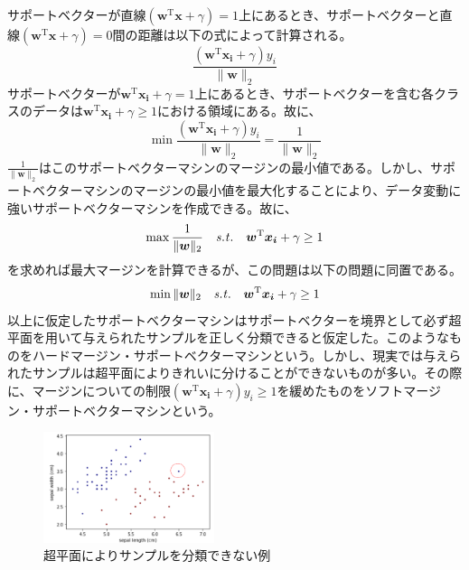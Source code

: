 サポートベクターが直線$(\bm{w}^{\mathrm{T}}\bm{x} + \gamma) = 1$上にあるとき、サポートベクターと直線$(\bm{w}^{\mathrm{T}}\bm{x} + \gamma) = 0$間の距離は以下の式によって計算される。
\begin{equation}
  \frac{(\bm{w}^{\mathrm{T}}\bm{x_i} + \gamma)y_i}{\|\bm{w}\|_2}
\end{equation}
サポートベクターが$\bm{w}^{\mathrm{T}}\bm{x_i} + \gamma = 1$上にあるとき、サポートベクターを含む各クラスのデータは$\bm{w}^{\mathrm{T}}\bm{x_i} + \gamma \ge 1$における領域にある。故に、
\begin{equation}
  \min\frac{(\bm{w}^{\mathrm{T}}\bm{x_i} + \gamma)y_i}{\|\bm{w}\|_2} = \frac{1}{\|\bm{w}\|_2}
\end{equation}
$\frac{1}{\|\bm{w}\|_2}$はこのサポートベクターマシンのマージンの最小値である。しかし、サポートベクターマシンのマージンの最小値を最大化することにより、データ変動に強いサポートベクターマシンを作成できる。故に、
\begin{equation}
  \max\frac{1}{\|\bm{w}\|_2}\text{\ \ \ }{\it{s.t.}}\text{\ \ \ }\bm{w}^{\mathrm{T}}\bm{x_i} + \gamma \ge 1
\end{equation}
を求めれば最大マージンを計算できるが、この問題は以下の問題に同置である。
\begin{equation}
  \min\|\bm{w}\|_2\text{\ \ \ }{\it{s.t.}}\text{\ \ \ }\bm{w}^{\mathrm{T}}\bm{x_i} + \gamma \ge 1
\end{equation}
以上に仮定したサポートベクターマシンはサポートベクターを境界として必ず超平面を用いて与えられたサンプルを正しく分類できると仮定した。このようなものをハードマージン・サポートベクターマシンという。しかし、現実では与えられたサンプルは超平面によりきれいに分けることができないものが多い。その際に、マージンについての制限$(\bm{w}^{\mathrm{T}}\bm{x_i} + \gamma)y_i \ge 1$を緩めたものをソフトマージン・サポートベクターマシンという。
\begin{figure}[h]
  \centering
  \includegraphics[width=5cm]{figure/section1/figure3.png}
  \caption{超平面によりサンプルを分類できない例}
\end{figure}
  



  




